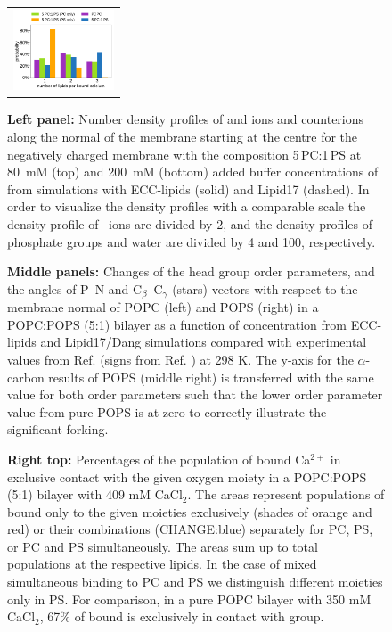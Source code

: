 \documentclass[journal=jpcbfk,manuscript=article]{achemso}
\begin{document}
\begin{figure}[tbp!]
\begin{tabular}{ c }
  \includegraphics[width=3cm]{../img/stoichiometry_CaCl2_comparison_Ecc-lipids_PC-vs-PCPS.pdf} 
  \end{tabular}
  \caption{\label{fig:cacl-dens_PCPS} 
    \textbf{Left panel:}
    Number density profiles of  and  ions and  counterions 
    along the normal of the membrane starting at the centre
    for the negatively charged membrane with the composition 5\,PC:1\,PS
    at 80~mM (top) and 200~mM (bottom) added buffer concentrations of  from simulations with ECC-lipids (solid) and Lipid17 (dashed). 
    In order to visualize the density profiles with a comparable scale 
    the density profile of~ ions are divided by 2, and 
    the density profiles of phosphate groups and water are divided by 4 and 100, respectively.  
  }
  \caption{\label{fig:delta_ordPar_CaCl_PCPS} 
    \textbf{Middle panels:}
    Changes of the head group order parameters, and the angles of P--N and C$_\beta$--C$_\gamma$ (stars) vectors 
    with respect to the membrane normal of POPC (left) and POPS (right) in a POPC:POPS (5:1) bilayer 
    as a function of  concentration from ECC-lipids and Lipid17/Dang simulations 
    compared with experimental values from Ref.  (signs from Ref. ) at 298 K.
    The y-axis for the $\alpha$-carbon results of POPS (middle right) is transferred
    with the same value for both order parameters such that the lower order
    parameter value from pure POPS is at zero to correctly illustrate the significant forking.
  }
  \caption{ \label{fig:cacl_complexes} 
  \textbf{Right top:} Percentages of the population of bound Ca$^{2+}$ 
	in exclusive contact with the given oxygen moiety
	in a POPC:POPS (5:1) bilayer with 409 mM CaCl$_2$. 
	The areas represent populations of bound  
	only to the given moieties exclusively (shades of orange and red)
	or their combinations (CHANGE:blue)
	separately for PC, PS, or PC and PS simultaneously. 
	The areas sum up to total populations at the respective lipids. 
	In the case of mixed simultaneous binding to PC and PS
	we distinguish different moieties only in PS.
	For comparison, in a pure POPC bilayer with 350 mM CaCl$_2$, 
	67\% of bound  is exclusively in contact with  group. \cite{melcr18} 
}
\end{figure}
\end{document}
